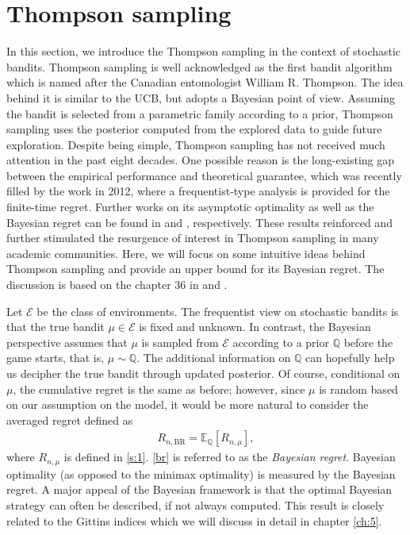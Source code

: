 \documentclass[letterpaper,10pt,openright,openany]{book}
\numberwithin{equation}{section}
\theoremstyle{plain}
\theoremstyle{definition}
\def\Q{{\mathbb Q}}
\def\E{{\mathbb E}}
\def\BR{{\text{BR}}}
\begin{document}
\section{Thompson sampling}

In this section, we introduce the Thompson sampling in the context of stochastic bandits. Thompson sampling \cite{Thompson_1933} is well acknowledged as the first bandit algorithm which is named after the Canadian entomologist William R. Thompson. 
The idea behind it is similar to the UCB, but adopts a Bayesian point of view. Assuming the bandit is selected from a parametric family according to a prior, Thompson sampling uses the posterior computed from the explored data to guide future exploration. 
Despite being simple, Thompson sampling has not received much attention in the past eight decades. One possible reason is the long-existing gap between the empirical performance and theoretical guarantee, which was recently filled by the work \cite{agrawal2012analysis} in 2012, where a frequentist-type analysis is provided for the finite-time regret.  Further works on its asymptotic optimality as well as the Bayesian regret can be found in \cite{Kaufmann_2012} and \cite{Russo_2014}, respectively. These results reinforced and further stimulated the resurgence of interest in Thompson sampling in many academic communities. Here, we will focus on some intuitive ideas behind Thompson sampling and provide an upper bound for its Bayesian regret. The discussion is based on the chapter 36 in \cite{lattimore2018bandit} and \cite{Russo_2014}. 

Let $\mathcal E$ be the class of environments. The frequentist view on stochastic bandits is that the true bandit $\mu\in\mathcal E$ is fixed and unknown. In contrast, the Bayesian perspective assumes that $\mu$ is sampled from $\mathcal E$ according to a prior $\Q$ before the game starts, that is, $\mu\sim\Q$. The additional information on $\Q$ can hopefully help us decipher the true bandit through updated posterior. Of course, conditional on $\mu$, the cumulative regret is the same as before; however, since $\mu$ is random based on our assumption on the model, it would be more natural to consider the averaged regret defined as
\begin{align}
R_{n, \BR}=\E_\Q[R_{n,\mu}],\label{br}
\end{align}
where $R_{n,\mu}$ is defined in \eqref{s:1}. \eqref{br} is referred to as the \emph{Bayesian regret}. Bayesian optimality (as opposed to the minimax optimality) is measured by the Bayesian regret. A major appeal of the Bayesian framework is that the optimal Bayesian strategy can often be described, if not always computed. This result is closely related to the Gittins indices which we will discuss in detail in chapter \ref{ch:5}.
\end{document}
